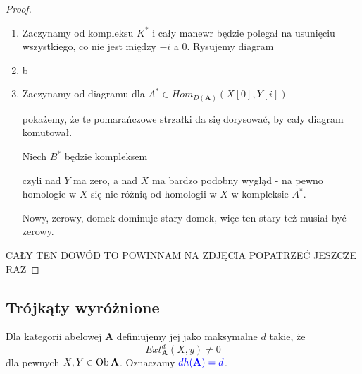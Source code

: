 \begin{proof}
  \begin{enumerate}[label=(\alph*)]
    \item Zaczynamy od kompleksu $K^*$ i cały manewr będzie polegał na usunięciu wszystkiego, co nie jest między $-i$ a $0$. Rysujemy diagram
      \begin{center}\end{center}
    \item b
    \item Zaczynamy od diagramu dla $A^*\in Hom_{D(\mathbf{A})}(X[0], Y[i])$
      \begin{center}\end{center}
      pokażemy, że te pomarańczowe strzałki da się dorysować, by cały diagram komutował.

      Niech $B^*$ będzie kompleksem
      \begin{center}\end{center}
      czyli nad $Y$ ma zero, a nad $X$ ma bardzo podobny wygląd - na pewno homologie w $X$ się nie różnią od homologii w $X$ w kompleksie $A^*$.

      Nowy, zerowy, domek dominuje stary domek, więc ten stary też musiał być zerowy.
  \end{enumerate}

  {\large\color{red}CAŁY TEN DOWÓD TO POWINNAM NA ZDJĘCIA POPATRZEĆ JESZCZE RAZ}
\end{proof}

\subsection{Trójkąty wyróżnione}

\begin{definition}
  Dla kategorii abelowej $\mathbf{A}$ definiujemy jej  jako maksymalne $d$ takie, że 
  $$Ext_{\mathbf{A}}^d(X, y)\neq0 $$
  dla pewnych $X,Y\in\operatorname{Ob}\mathbf{A}$. Oznaczamy $\color{blue}dh(\mathbf{A})=d$.
\end{definition}

